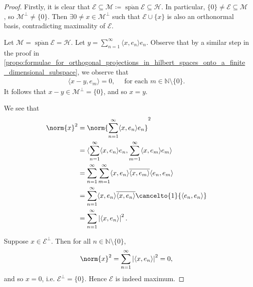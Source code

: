 \documentclass[notoc,notitlepage]{tufte-book}
\DeclareMathOperator{\Span}{span}
\begin{document}
\begin{proof}
   Firstly, it is clear that
  $\mathcal{E} \subseteq \mathcal{M} \coloneqq \overline{\Span} \mathcal{E} \subseteq \mathcal{H}$.
  In particular, $\{ 0 \} \neq \mathcal{E} \subseteq \mathcal{M}$,
  so $\mathcal{M}^\perp \neq \{ 0 \}$.
  Then $\exists 0 \neq x \in \mathcal{M}^\perp$ such that
  $\mathcal{E} \cup \{ x \}$ is also an orthonormal basis,
  contradicting maximality of $\mathcal{E}$.

  \noindent
   Let $\mathcal{M} = \overline{\Span} \mathcal{E} = \mathcal{H}$.
  Let $y = \sum_{n=1}^{\infty} \langle x, e_n \rangle e_n$.
  Observe that by a similar step in the proof in
  \cref{propo:formulae_for_orthogonal_projections_in_hilbert_spaces_onto_a_finite_dimensional_subspace},
  we observe that
  \begin{align*}
    \langle x - y, e_m \rangle = 0, \quad \text{ for each } m \in \mathbb{N} \setminus \{ 0 \}.
  \end{align*}
  It follows that $x - y \in \mathcal{M}^\perp = \{ 0 \}$, and so $x = y$.

  \noindent
  We see that
  \begin{align*}
    \norm{x}^2
    &= \norm{ \sum_{n=1}^{\infty} \langle x, e_n \rangle e_n }^2 \\
    &= \langle \sum_{n=1}^{\infty} \langle x, e_n \rangle e_n,
        \sum_{m=1}^{\infty} \langle x, e_m \rangle e_m \rangle \\
    &= \sum_{n=1}^{\infty} \sum_{m=1}^{\infty} \langle x, e_n \rangle
      \overline{\langle x, e_m \rangle} \langle e_n, e_m \rangle \\
    &= \sum_{n=1}^{\infty} \langle x, e_n \rangle
      \overline{\langle x, e_n \rangle} \cancelto{1}{\langle e_n, e_n \rangle} \\
    &= \sum_{n=1}^{\infty} \abs{\langle x, e_n \rangle}^2.
  \end{align*}

  \noindent
  Suppose $x \in \mathcal{E}^\perp$. Then for all $n \in \mathbb{N} \setminus \{ 0 \}$,
  \begin{equation*}
    \norm{x}^2 = \sum_{n=1}^{\infty} \abs{\langle x, e_n \rangle}^2 = 0,
  \end{equation*}
  and so $x = 0$, i.e. $\mathcal{E}^\perp = \{ 0 \}$.
  Hence $\mathcal{E}$ is indeed maximum.
\end{proof}
\end{document}

